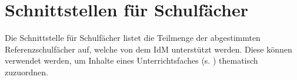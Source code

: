 \section{Schnittstellen für Schulfächer}
Die Schnittstelle für Schulfächer listet die Teilmenge der abgestimmten Referenzschulfächer auf, welche von dem IdM unterstützt werden.
Diese können verwendet werden, um Inhalte eines Unterrichtsfaches (s. ) thematisch zuzuordnen.



%

%
%